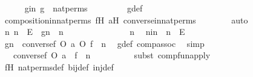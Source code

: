 \begin{isabellebody}
\ \ \ \ \isamarkupfalse%
\ gin{\isacharcolon}{\kern0pt}\ {\isachardoublequoteopen}g\ {\isasymin}\ nat{\isacharunderscore}{\kern0pt}perms{\isachardoublequoteclose}\ \isanewline
\ \ \ \ \ \ \isamarkupfalse%
\ g{\isacharunderscore}{\kern0pt}def\ \isanewline
\ \ \ \ \ \ \isamarkupfalse%
\ composition{\isacharunderscore}{\kern0pt}in{\isacharunderscore}{\kern0pt}nat{\isacharunderscore}{\kern0pt}perms\ fH\ aH\ converse{\isacharunderscore}{\kern0pt}in{\isacharunderscore}{\kern0pt}nat{\isacharunderscore}{\kern0pt}perms\isanewline
\ \ \ \ \ \ \isamarkupfalse%
\ auto\isanewline
\isanewline
\ \ \ \ \isamarkupfalse%
\ {\isachardoublequoteopen}{\isasymAnd}n{\isachardot}{\kern0pt}\ n\ {\isasymin}\ E\ {\isasymLongrightarrow}\ g{\isacharbackquote}{\kern0pt}n\ {\isacharequal}{\kern0pt}\ n{\isachardoublequoteclose}\isanewline
\ \ \ \ \isamarkupfalse%
{\isacharminus}{\kern0pt}\ \ \isanewline
\ \ \ \ \ \ \isamarkupfalse%
\ n\ \isamarkupfalse%
\ nin\ {\isacharcolon}{\kern0pt}\ {\isachardoublequoteopen}n\ {\isasymin}\ E{\isachardoublequoteclose}\ \isanewline
\ \ \ \ \ \ \isamarkupfalse%
\ {\isachardoublequoteopen}g{\isacharbackquote}{\kern0pt}n\ {\isacharequal}{\kern0pt}\ {\isacharparenleft}{\kern0pt}{\isacharparenleft}{\kern0pt}converse{\isacharparenleft}{\kern0pt}f{\isacharparenright}{\kern0pt}\ O\ a{\isacharparenright}{\kern0pt}\ O\ f{\isacharparenright}{\kern0pt}\ {\isacharbackquote}{\kern0pt}\ n{\isachardoublequoteclose}\ \isamarkupfalse%
\ g{\isacharunderscore}{\kern0pt}def\ comp{\isacharunderscore}{\kern0pt}assoc\ \isamarkupfalse%
\ simp\isanewline
\ \ \ \ \ \ \isamarkupfalse%
\ \isamarkupfalse%
\ {\isachardoublequoteopen}{\isachardot}{\kern0pt}{\isachardot}{\kern0pt}{\isachardot}{\kern0pt}\ {\isacharequal}{\kern0pt}\ {\isacharparenleft}{\kern0pt}converse{\isacharparenleft}{\kern0pt}f{\isacharparenright}{\kern0pt}\ O\ a{\isacharparenright}{\kern0pt}\ {\isacharbackquote}{\kern0pt}\ {\isacharparenleft}{\kern0pt}f\ {\isacharbackquote}{\kern0pt}\ n{\isacharparenright}{\kern0pt}{\isachardoublequoteclose}\ \isanewline
\ \ \ \ \ \ \ \ \isamarkupfalse%
{\isacharparenleft}{\kern0pt}subst\ comp{\isacharunderscore}{\kern0pt}fun{\isacharunderscore}{\kern0pt}apply{\isacharparenright}{\kern0pt}\isanewline
\ \ \ \ \ \ \ \ \isamarkupfalse%
\ fH\ nat{\isacharunderscore}{\kern0pt}perms{\isacharunderscore}{\kern0pt}def\ bij{\isacharunderscore}{\kern0pt}def\ inj{\isacharunderscore}{\kern0pt}def\ \isanewline

\end{isabellebody}
